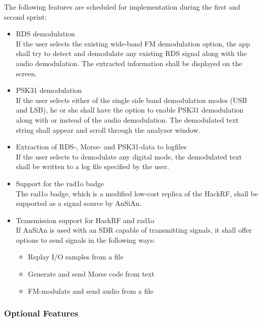 The following features are scheduled for implementation during the first and
second sprint:
\begin{itemize}
	\item \ac{RDS} demodulation \\
		If the user selects the existing wide-band \ac{FM} demodulation option,
		the app shall try to detect and demodulate any existing \ac{RDS}
		signal along with the audio demodulation. The extracted information
		shall be displayed on the screen.
	\item \ac{PSK31} demodulation \\
		If the user selects either of the single side band demodulation modes
		(\ac{USB} and \ac{LSB}), he or she shall have the option to enable
		\ac{PSK31} demodulation along with or instead of the audio demodulation.
		The demodulated text string shall appear and scroll through the
		analyzer window.
	\item Extraction of RDS-, Morse- and \ac{PSK31}-data to logfiles \\
		If the user selects to demodulate any digital mode, the demodulated
		text shall be written to a log file specified by the user.
	\item Support for the rad1o badge \\
		The rad1o badge, which is a modified low-cost replica of the HackRF,
		shall be supported as a signal source by \ac{AnSiAn}.
	\item Transmission support for HackRF and rad1o \\
		If \ac{AnSiAn} is used with an \ac{SDR} capable of transmitting signals,
		it shall offer options to send signals in the following ways:
		\begin{itemize}
			\item Replay I/O samples from a file
			\item Generate and send Morse code from text
			\item FM-modulate and send audio from a file
		\end{itemize}
\end{itemize}

\subsubsection{Optional Features}

